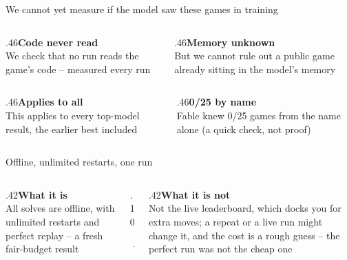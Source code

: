 \documentclass[aspectratio=169,11pt]{beamer}
\begin{document}
\begin{frame}{We cannot yet measure if the model saw these games in training}\vfill\begin{columns}[T]\begin{column}{.46\textwidth}{\color{owdeep}\bfseries Code never read}\\[2pt]{\color{owmuted}\small We check that no run reads the game's code -- measured every run}\end{column}\begin{column}{.46\textwidth}{\color{owdeep}\bfseries Memory unknown}\\[2pt]{\color{owmuted}\small But we cannot rule out a public game already sitting in the model's memory}\end{column}\end{columns}\vskip12pt\begin{columns}[T]\begin{column}{.46\textwidth}{\color{owdeep}\bfseries Applies to all}\\[2pt]{\color{owmuted}\small This applies to every top-model result, the earlier best included}\end{column}\begin{column}{.46\textwidth}{\color{owdeep}\bfseries 0/25 by name}\\[2pt]{\color{owmuted}\small Fable knew 0/25 games from the name alone (a quick check, not proof)}\end{column}\end{columns}\vfill\end{frame}
\begin{frame}{Offline, unlimited restarts, one run}\vfill\begin{columns}[c]\begin{column}{.42\textwidth}{\color{owdeep}\large\bfseries What it is}\\[3pt]{\color{owmuted}All solves are offline, with unlimited restarts and perfect replay -- a fresh fair-budget result}\end{column}\begin{column}{.10\textwidth}\begin{center}{\color{owochre}\Huge$\rightarrow$}\end{center}\end{column}\begin{column}{.42\textwidth}{\color{owdeep}\large\bfseries What it is not}\\[3pt]{\color{owmuted}Not the live leaderboard, which docks you for extra moves; a repeat or a live run might change it, and the cost is a rough guess -- the perfect run was not the cheap one}\end{column}\end{columns}\vfill\end{frame}
\end{document}
